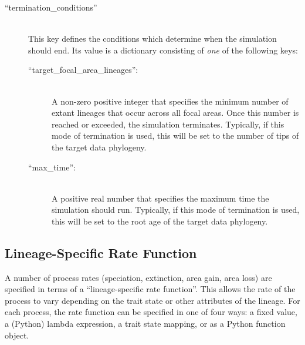 \documentclass[11pt,openany]{memoir} %
\begin{document}
\begin{description}
    \item[``termination\_conditions'']  \hfill \\
        This key defines the conditions which determine when the simulation should end.
        Its value is a dictionary consisting of \textit{one} of the following keys:
        \begin{description}
            \item[``target\_focal\_area\_lineages'':] \hfill \\
                A non-zero positive integer that specifies the minimum number of extant lineages that occur across all focal areas.
                Once this number is reached or exceeded, the simulation terminates.
                Typically, if this mode of termination is used, this will be set to the number of tips of the target data phylogeny.
            \item[``max\_time'':] \hfill \\
                A positive real number that specifies the maximum time the simulation should run.
                Typically, if this mode of termination is used, this will be set to the root age of the target data phylogeny.
        \end{description}

\end{description}

\subsection{Lineage-Specific Rate Function}

A number of process rates (speciation, extinction, area gain, area loss) are specified in terms of a ``lineage-specific rate function''.
This allows the rate of the process to vary depending on the trait state or other attributes of the lineage.
For each process, the rate function can be specified in one of four ways: a fixed value, a (Python) lambda expression, a trait state mapping, or as a Python function object.
\end{document}

